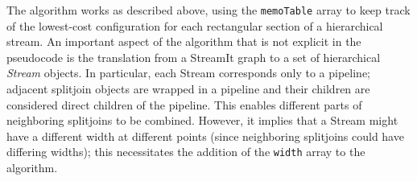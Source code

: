 The algorithm
works as described above, using the {\tt memoTable} array to keep
track of the lowest-cost configuration for each rectangular section of
a hierarchical stream.  An important aspect of the algorithm that is
not explicit in the pseudocode is the translation from a StreamIt
graph to a set of hierarchical {\it Stream} objects.  In particular,
each Stream corresponds only to a pipeline; adjacent 
splitjoin objects are wrapped in a pipeline and their children
are considered direct children of the pipeline. This enables
different parts of neighboring splitjoins to be combined.
However, it implies that a Stream might have a different width
at different points (since neighboring splitjoins could have
differing widths); this necessitates the addition of the {\tt width}
array to the algorithm.

